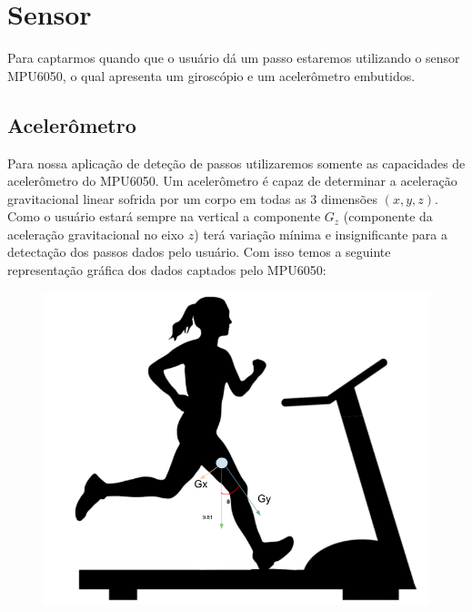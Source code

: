 \documentclass{article}
\date{}
\author{}
\title {\docTitle}
\begin{document}
    
    \maketitle
    \thispagestyle{documentCover}
    
  
    \newpage
    \pagestyle{documentBody}
    \tableofcontents
    \newpage

    \section{Sensor}
        Para captarmos quando que o usuário dá um passo estaremos utilizando o sensor MPU6050, o qual apresenta um
        giroscópio e um acelerômetro embutidos. 
    
        \subsection*{Acelerômetro}
            Para nossa aplicação de deteção de passos utilizaremos somente as capacidades de acelerômetro do
            MPU6050.
            Um acelerômetro é capaz de determinar a aceleração gravitacional linear sofrida por um corpo em todas as 3
            dimensões $(x,y,z)$. Como o usuário estará sempre na vertical a componente $G_z$ (componente da
            aceleração gravitacional no eixo $z$) terá variação mínima e insignificante para a detectação dos
            passos dados pelo usuário. Com isso temos a seguinte representação gráfica dos dados captados pelo
            MPU6050: 
            
            \begin{figure}[h!]
                \centering
                \includegraphics[width=.7\textwidth]{img/Screen Shot 2020-10-06 at 8.17.44 PM.png}
            \end{figure}
        
\end{document}
